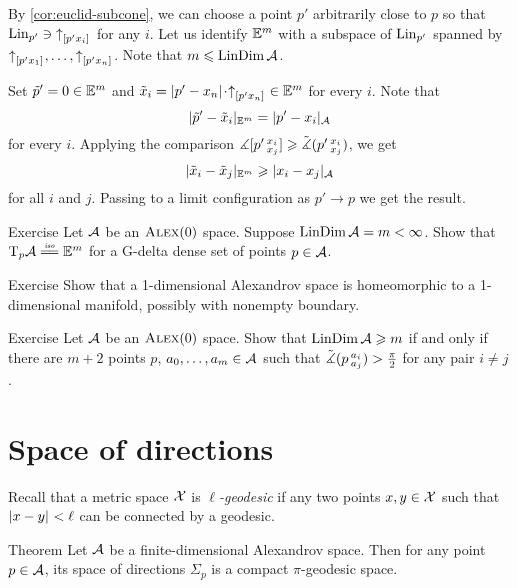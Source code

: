 By \ref{cor:euclid-subcone}, we can choose a point $p'$ arbitrarily close to $p$ so that 
$\mathop{\rm Lin}\nolimits_{p'}\ni {\uparrow}_{[{p'}{x_i}]_{{}}}$ for any $i$.
Let us identify $\mathbb{E}^m$ with a subspace of $\mathop{\rm Lin}\nolimits_{p'}$ spanned by ${\uparrow}_{[{p'}{x_1}]_{{}}},\dots,{\uparrow}_{[{p'}{x_n}]_{{}}}$.
Note that $m\leqslant \mathop{\rm LinDim}\nolimits\mathcal{A}$.

Set $\tilde p'=0\in \mathbb{E}^m$ and $\tilde x_i=\dist{p'}{x_n}{}\cdot\dir{p'}{x_n}\in \EE^m$ for every $i$.
Note that 
\[|\tilde p'-\tilde x_i|_{\mathbb{E}^m}=| p'- x_i|_{\mathcal{A}}\]
for every $i$.
Applying the comparison $\measuredangle[p'\,{}^{x_i}_{x_j}]\geqslant \tilde\measuredangle(p'\,{}^{x_i}_{x_j})$, we get
\[|\tilde x_i-\tilde x_j|_{\mathbb{E}^m}\geqslant |x_i- x_j|_{\mathcal{A}}\]
for all $i$ and $j$.
Passing to a limit configuration as $p'\to p$ we get the result.
\qeds

\begin{thm}{Exercise}\label{ex:tangent=Em}
Let $\mathcal{A}$ be an $\textsc{Alex}(0)$ space.
Suppose $\mathop{\rm LinDim}\nolimits\mathcal{A}=m<\infty$.
Show that $\T_p\spc{A}\iso \EE^m$ for a G-delta dense set of points $p\in\mathcal{A}$.
\end{thm}

\begin{thm}{Exercise}\label{ex:dim=1}
Show that a 1-dimensional Alexandrov space is homeomorphic to a 1-dimensional manifold, possibly with nonempty boundary.
\end{thm}


\begin{thm}{Exercise}\label{ex:resporka}
Let $\mathcal{A}$ be an $\textsc{Alex}(0)$ space.
Show that $\mathop{\rm LinDim}\nolimits \mathcal{A}\geqslant m$ if and only if there are $m+2$ points $p$, $a_0,\dots, a_{m}\in \mathcal{A}$
such that $\tilde\measuredangle(p\,{}^{a_i}_{a_j})>\tfrac\pi2$ for any pair $i\ne j$.
\end{thm}

\section{Space of directions}

Recall that a metric space $\mathcal{X}$ is \emph{$\ell$-geodesic}
if any two points $x,y\in\mathcal{X}$ such that $|{x}-{y}|_{}^{{}}<\ell$ can be connected by a geodesic.

\begin{thm}{Theorem}\label{thm:finite-space-of-directions}
Let $\mathcal{A}$ be a finite-dimensional Alexandrov space.
Then for any point $p\in \mathcal{A}$, its space of directions $\Sigma_p$ is a compact $\pi$-geodesic space.
\end{thm}

